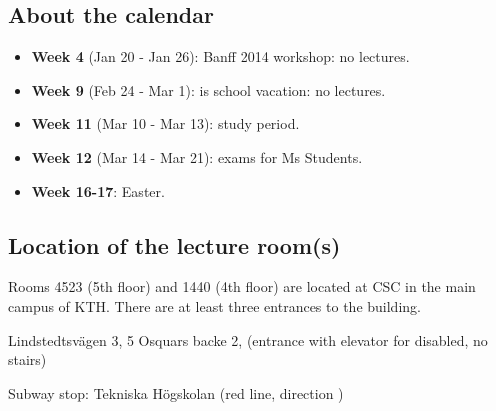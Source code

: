 \documentclass[a4paper,justified]{tufte-handout}
\begin{document}
\subsection{About the calendar}
\label{sec-1-1}


\begin{itemize}
\item \textbf{Week  4} (Jan 20 - Jan 26): Banff 2014 workshop: no lectures.
\item \textbf{Week  9} (Feb 24 - Mar  1): is school vacation: no lectures.
\item \textbf{Week 11} (Mar 10 - Mar 13): study period.
\item \textbf{Week 12} (Mar 14 - Mar 21): exams for Ms Students.
\item \textbf{Week 16-17}: Easter.
\end{itemize}
\subsection{Location of the lecture room(s)}
\label{sec-1-2}


   Rooms 4523 (5th  floor) and 1440 (4th floor) are  located at CSC in
   the main campus  of KTH. There are at least  three entrances to the
   building.

   Lindstedtsvägen 3, 5
   Osquars backe 2, (entrance with elevator for disabled, no stairs) 

   Subway stop: Tekniska Högskolan (red line, direction )
\end{document}
